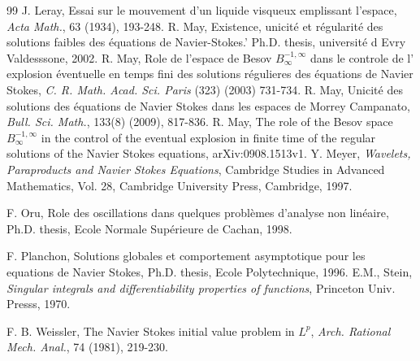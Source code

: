 \documentclass[11pt]{amsart}%
\theoremstyle{plain}
\numberwithin{equation}{section}
\begin{document}
\begin{thebibliography}{99}
 J. Leray, Essai sur le mouvement d'un liquide visqueux emplissant l'espace, \textit{Acta Math.}, 63 (1934), 193-248.
 R. May, Existence, unicit\'e et r\'egularit\'e des solutions faibles des \'equations de Navier-Stokes.' Ph.D. thesis, universit\'e d Evry Valdesssone, 2002.
 R. May, Role de l'espace de Besov $B^{-1,\infty}_\infty$ dans  le controle de l' explosion \'eventuelle en temps fini des solutions r\'egulieres des \'equations de Navier Stokes, \textit{C. R. Math. Acad. Sci. Paris} (323) (2003) 731-734.
 R. May, Unicit\'e des solutions des équations de Navier Stokes dans les espaces de Morrey Campanato, \textit{Bull. Sci. Math.}, 133(8) (2009), 817-836.
 R. May, The role of the Besov space $B^{-1,\infty}_\infty$  in the control of the eventual explosion in finite time of the regular solutions of the Navier Stokes equations,  arXiv:0908.1513v1.
 Y. Meyer, \textit{Wavelets, Paraproducts and Navier Stokes Equations}, Cambridge Studies in Advanced Mathematics, Vol. 28, Cambridge University Press, Cambridge, 1997.

 F. Oru, Role des oscillations dans quelques problèmes d'analyse non lin\'eaire, Ph.D. thesis, Ecole Normale Sup\'erieure de Cachan, 1998.

 F. Planchon, Solutions globales et comportement asymptotique pour les equations de Navier Stokes, Ph.D. thesis, Ecole Polytechnique, 1996.
 E.M., Stein, \textit{Singular integrals and differentiability properties of functions}, Princeton Univ. Presss, 1970.

 F. B. Weissler, The Navier Stokes initial value problem in $L^p$, \textit{Arch. Rational Mech. Anal.}, 74 (1981), 219-230.

\end{thebibliography}
\end{document}
